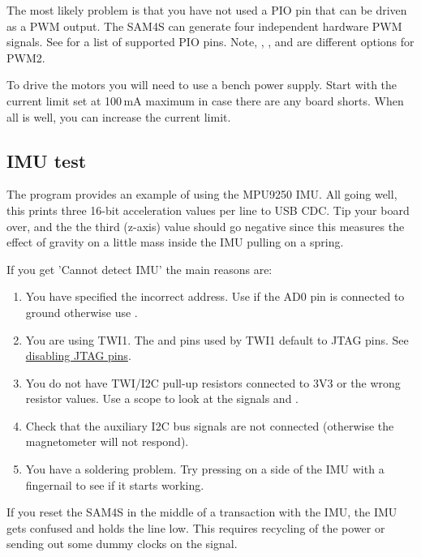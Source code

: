 The most likely problem is that you have not used a PIO pin that can
be driven as a PWM output. The SAM4S can generate four independent
hardware PWM signals. See  for a list of
supported PIO pins. Note, , , and  are
different options for PWM2.

To drive the motors you will need to use a bench power supply. Start
with the current limit set at 100\,mA maximum in case there are any
board shorts.  When all is well, you can increase the current limit.

\subsection{IMU test}
\label{imu-test}

The program  provides an
example of using the MPU9250 IMU.  All going well, this prints three
16-bit acceleration values per line to USB CDC. Tip your board over,
and the the third (z-axis) value should go negative since this
measures the effect of gravity on a little mass inside the IMU pulling
on a spring.

If you get 'Cannot detect IMU' the main reasons are:

\begin{enumerate}
\item
  You have specified the incorrect address. Use  if the
  AD0 pin is connected to ground otherwise use .
\item
  You are using TWI1. The  and  pins used by TWI1 default to JTAG
  pins. See \protect\hyperref[disabling-jtag-pins]{disabling JTAG pins}.
\item
  You do not have TWI/I2C pull-up resistors connected to 3V3 or the
  wrong resistor values. Use a scope to look at the signals 
  and .
\item
  Check that the auxiliary I2C bus signals are not connected
  (otherwise the magnetometer will not respond).  
\item
  You have a soldering problem. Try pressing on a side of the IMU with a
  fingernail to see if it starts working.
\end{enumerate}

If you reset the SAM4S in the middle of a transaction with the
IMU, the IMU gets confused and holds the  line low. This
requires recycling of the power or sending out some dummy clocks on
the  signal.


